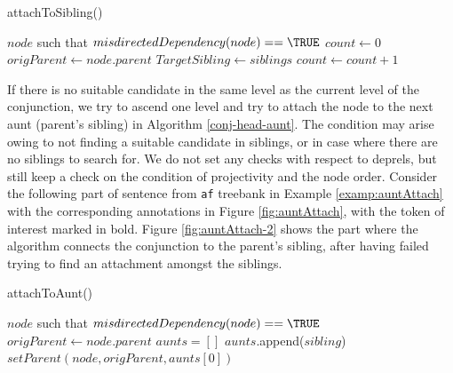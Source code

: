 \begin{algorithm}[H]
\caption{attachToSibling()}
\label{conj-head-sibling}
\begin{algorithmic}[1]
\REQUIRE $node$ such that $misdirectedDependency(node) == \TRUE$
\STATE {}
\STATE $count \leftarrow 0$
\STATE $origParent \leftarrow node.parent$
     \label{line:conj-sibling-countcheck1}
            \STATE $TargetSibling \leftarrow siblings$
            \STATE $count \leftarrow count + 1$
        \ENDIF
    \ENDFOR
        \STATE {}
            \RETURN \TRUE
        \ENDIF
    \ENDIF \label{line:conj-sibling-countcheck2}
    \STATE {}
                \RETURN \TRUE
            \ENDIF
        \ENDIF
    \ENDFOR
                \RETURN \TRUE
            \ENDIF
        \ENDIF
    \ENDFOR
\RETURN \FALSE
\end{algorithmic}
\end{algorithm}

If there is no suitable candidate in the same level as the current level of the conjunction, we try to ascend one level and try to attach the node to the next aunt (parent's sibling) in Algorithm \ref{conj-head-aunt}. The condition may arise owing to not finding a suitable candidate in siblings, or in case where there are no siblings to search for. We do not set any checks with respect to deprels, but still keep a check on the condition of projectivity and the node order. Consider the following part of sentence from \verb|af| treebank in Example \ref{examp:auntAttach} with the corresponding annotations in Figure \ref{fig:auntAttach}, with the token of interest marked in bold. Figure \ref{fig:auntAttach-2} shows the part where the algorithm connects the conjunction to the parent's sibling, after having failed trying to find an attachment amongst the siblings.

\begin{algorithm}[H]
\caption{attachToAunt()}
\label{conj-head-aunt}
\begin{algorithmic}[1]
\REQUIRE $node$ such that $misdirectedDependency(node) == \TRUE$
\STATE {}
\STATE $origParent \leftarrow node.parent$
\STATE $aunts = []$
        \STATE $aunts$.append($sibling$)
    \ENDIF
\ENDFOR
\STATE {}
    \STATE $setParent(node, origParent, aunts[0])$
\ENDIF
\RETURN \FALSE
\end{algorithmic}
\end{algorithm}

